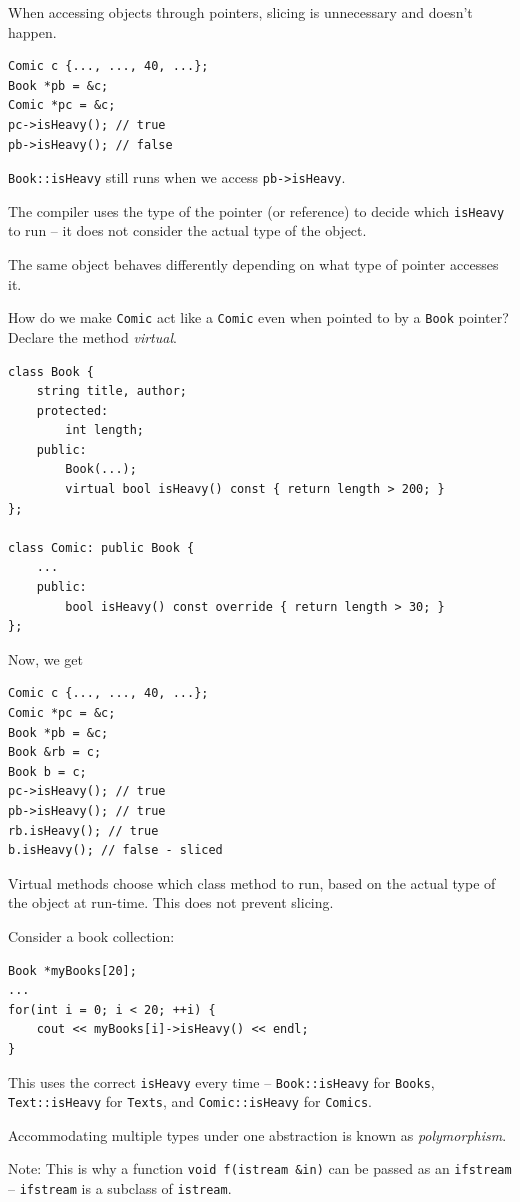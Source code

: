 \documentclass[11pt]{article}
\theoremstyle{definition}
\begin{document}
When accessing objects through pointers, slicing is unnecessary and doesn't happen.
\begin{lstlisting}
Comic c {..., ..., 40, ...};
Book *pb = &c;
Comic *pc = &c;
pc->isHeavy(); // true
pb->isHeavy(); // false
\end{lstlisting}
\vspace{-0.25cm}
{\tt Book::isHeavy} still runs when we access {\tt pb->isHeavy}. 

The compiler uses the type of the pointer (or reference) to decide which {\tt isHeavy} to run -- it does not consider the actual type of the object.

The same object behaves differently depending on what type of pointer accesses it.

How do we make {\tt Comic} act like a {\tt Comic} even when pointed to by a {\tt Book} pointer? Declare the method {\it virtual}.
\begin{lstlisting}
class Book {
    string title, author;
    protected:
        int length;
    public:
        Book(...);
        virtual bool isHeavy() const { return length > 200; }
};

class Comic: public Book {
    ...
    public:
        bool isHeavy() const override { return length > 30; }
};      
\end{lstlisting}
Now, we get
\begin{lstlisting}
Comic c {..., ..., 40, ...};
Comic *pc = &c;
Book *pb = &c;
Book &rb = c;
Book b = c;
pc->isHeavy(); // true
pb->isHeavy(); // true
rb.isHeavy(); // true
b.isHeavy(); // false - sliced
\end{lstlisting}
\vspace{-0.25cm}
Virtual methods choose which class method to run, based on the actual type of the object at run-time. This does not prevent slicing.

Consider a book collection:
\begin{lstlisting}
Book *myBooks[20];
...
for(int i = 0; i < 20; ++i) {
    cout << myBooks[i]->isHeavy() << endl;
}
\end{lstlisting}
\vspace{-0.25cm}
This uses the correct {\tt isHeavy} every time -- {\tt Book::isHeavy} for {\tt Books}, {\tt Text::isHeavy} for {\tt Texts}, and {\tt Comic::isHeavy} for {\tt Comics}.

Accommodating multiple types under one abstraction is known as {\it polymorphism}.

Note: This is why a function {\tt void f(istream \&in)} can be passed as an {\tt ifstream} -- {\tt ifstream} is a subclass of {\tt istream}.
\end{document}
